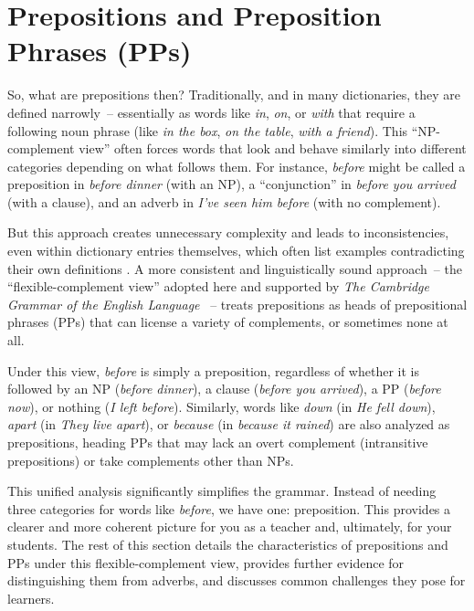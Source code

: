\section{Prepositions and Preposition Phrases (PPs)}

So, what are prepositions then? Traditionally, and in many dictionaries, they are defined narrowly~-- essentially as words like \textit{in}, \textit{on}, or \textit{with} that require a following noun phrase (like \textit{in the box}, \textit{on the table}, \textit{with a friend}). This ``NP-complement view'' often forces words that look and behave similarly into different categories depending on what follows them. For instance, \textit{before} might be called a preposition in \textit{before dinner} (with an NP), a ``conjunction'' in \textit{before you arrived} (with a clause), and an adverb in \textit{I've seen him before} (with no complement).

But this approach creates unnecessary complexity and leads to inconsistencies, even within dictionary entries themselves, which often list examples contradicting their own definitions \autocite{reynolds2025}. A more consistent and linguistically sound approach~-- the ``flexible-complement view'' adopted here and supported by \textit{The Cambridge Grammar of the English Language} \autocite{Huddleston2002}~-- treats prepositions as heads of prepositional phrases (PPs) that can license a variety of complements, or sometimes none at all.

Under this view, \textit{before} is simply a preposition, regardless of whether it is followed by an NP (\textit{before dinner}), a clause (\textit{before you arrived}), a PP (\textit{before now}), or nothing (\textit{I left before}). Similarly, words like \textit{down} (in \textit{He fell down}), \textit{apart} (in \textit{They live apart}), or \textit{because} (in \textit{because it rained}) are also analyzed as prepositions, heading PPs that may lack an overt complement (intransitive prepositions) or take complements other than NPs.

This unified analysis significantly simplifies the grammar. Instead of needing three categories for words like \textit{before}, we have one: preposition. This provides a clearer and more coherent picture for you as a teacher and, ultimately, for your students. The rest of this section details the characteristics of prepositions and PPs under this flexible-complement view, provides further evidence for distinguishing them from adverbs, and discusses common challenges they pose for learners.

